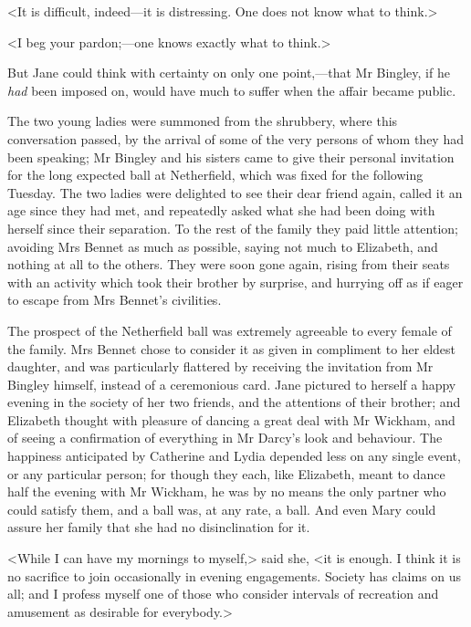 <It is difficult, indeed—it is distressing. One does not know what to think.>

<I beg your pardon;—one knows exactly what to think.>

But Jane could think with certainty on only one point,—that Mr Bingley, if he \textit{had} been imposed on, would have much to suffer when the affair became public.

The two young ladies were summoned from the shrubbery, where this conversation passed, by the arrival of some of the very persons of whom they had been speaking; Mr Bingley and his sisters came to give their personal invitation for the long expected ball at Netherfield, which was fixed for the following Tuesday. The two ladies were delighted to see their dear friend again, called it an age since they had met, and repeatedly asked what she had been doing with herself since their separation. To the rest of the family they paid little attention; avoiding Mrs Bennet as much as possible, saying not much to Elizabeth, and nothing at all to the others. They were soon gone again, rising from their seats with an activity which took their brother by surprise, and hurrying off as if eager to escape from Mrs Bennet's civilities.



The prospect of the Netherfield ball was extremely agreeable to every female of the family. Mrs Bennet chose to consider it as given in compliment to her eldest daughter, and was particularly flattered by receiving the invitation from Mr Bingley himself, instead of a ceremonious card. Jane pictured to herself a happy evening in the society of her two friends, and the attentions of their brother; and Elizabeth thought with pleasure of dancing a great deal with Mr Wickham, and of seeing a confirmation of everything in Mr Darcy's look and behaviour. The happiness anticipated by Catherine and Lydia depended less on any single event, or any particular person; for though they each, like Elizabeth, meant to dance half the evening with Mr Wickham, he was by no means the only partner who could satisfy them, and a ball was, at any rate, a ball. And even Mary could assure her family that she had no disinclination for it.

<While I can have my mornings to myself,> said she, <it is enough. I think it is no sacrifice to join occasionally in evening engagements. Society has claims on us all; and I profess myself one of those who consider intervals of recreation and amusement as desirable for everybody.>

